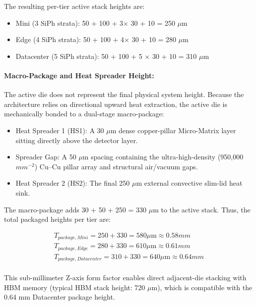 \documentclass[journal]{IEEEtran}
\begin{document}
The resulting per-tier active stack heights are:
\begin{itemize}
\item  Mini (3 SiPh strata): 50 + 100 + 3$\times$ 30 + 10 = 250 $\mu$m
\item  Edge (4 SiPh strata): 50 + 100 + 4$\times$ 30 + 10 = 280 $\mu$m
\item  Datacenter (5 SiPh strata): 50 + 100 + 5 $\times$ 30 + 10 = 310 $\mu$m
\end{itemize}

\paragraph{\textbf{Macro-Package and Heat Spreader Height:}}

The active die does not represent the final physical system height. Because the architecture relies on directional upward heat extraction, the active die is mechanically bonded to a dual-stage macro-package:

\begin{itemize}
\item Heat Spreader 1 (HS1): A 30 $\mu$m dense copper-pillar Micro-Matrix layer sitting directly above the detector layer.
\item Spreader Gap: A 50 $\mu$m spacing containing the ultra-high-density (950,000 $mm^{-2}$) Cu--Cu pillar array and structural air/vacuum gaps.
\item Heat Spreader 2 (HS2): The final 250 $\mu$m external convective slim-lid heat sink.
\end{itemize}

The macro-package adds 30 + 50 + 250 = 330 $\mu$m to the active stack. 
Thus, the total packaged heights per tier are:

\begin{equation}
\begin{aligned}
T_{package,Mini} = 250 + 330 = 580 \mu\text{m} \approx 0.58 mm \\
T_{package,Edge} = 280 + 330 = 610 \mu\text{m} \approx 0.61 mm \\
T_{package,Datacenter} = 310 + 330 = 640 \mu\text{m} \approx 0.64 mm \\
\end{aligned}
\end{equation}

This sub-millimeter Z-axis form factor enables direct adjacent-die stacking with HBM memory (typical HBM stack height: 720 $\mu$m), which is compatible with the 0.64 mm Datacenter package height.
\end{document}
